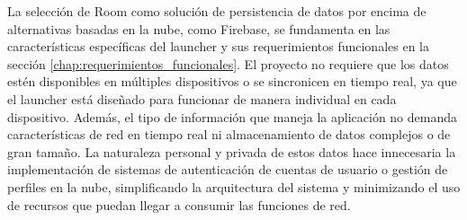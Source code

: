 La selección de Room como solución de persistencia de datos por encima de alternativas basadas en la nube, como Firebase, se fundamenta en las características específicas del launcher y sus requerimientos funcionales en la sección \ref{chap:requerimientos_funcionales}. El proyecto no requiere que los datos estén disponibles en múltiples dispositivos o se sincronicen en tiempo real, ya que el launcher está diseñado para funcionar de manera individual en cada dispositivo. Además, el tipo de información que maneja la aplicación no demanda características de red en tiempo real ni almacenamiento de datos complejos o de gran tamaño. La naturaleza personal y privada de estos datos hace innecesaria la implementación de sistemas de autenticación de cuentas de usuario o gestión de perfiles en la nube, simplificando la arquitectura del sistema y minimizando el uso de recursos que puedan llegar a consumir las funciones de red.
